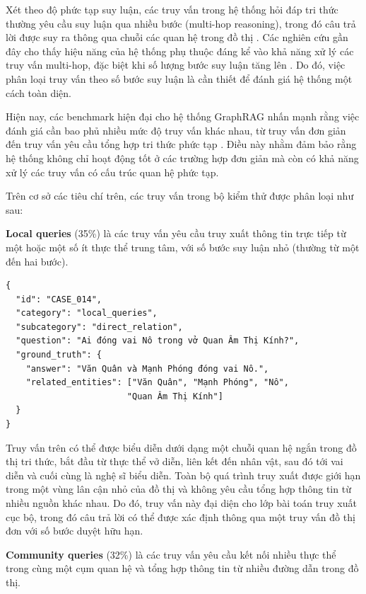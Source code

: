 Xét theo độ phức tạp suy luận, các truy vấn trong hệ thống hỏi đáp tri thức thường yêu cầu suy luận qua nhiều bước (multi-hop reasoning), trong đó câu trả lời được suy ra thông qua chuỗi các quan hệ trong đồ thị \cite{wang2023multihop}. Các nghiên cứu gần đây cho thấy hiệu năng của hệ thống phụ thuộc đáng kể vào khả năng xử lý các truy vấn multi-hop, đặc biệt khi số lượng bước suy luận tăng lên \cite{shah2024multihop}. Do đó, việc phân loại truy vấn theo số bước suy luận là cần thiết để đánh giá hệ thống một cách toàn diện.

Hiện nay, các benchmark hiện đại cho hệ thống GraphRAG nhấn mạnh rằng việc đánh giá cần bao phủ nhiều mức độ truy vấn khác nhau, từ truy vấn đơn giản đến truy vấn yêu cầu tổng hợp tri thức phức tạp \cite{peng2025m3gqa}. Điều này nhằm đảm bảo rằng hệ thống không chỉ hoạt động tốt ở các trường hợp đơn giản mà còn có khả năng xử lý các truy vấn có cấu trúc quan hệ phức tạp.

Trên cơ sở các tiêu chí trên, các truy vấn trong bộ kiểm thử được phân loại như sau:

\textbf{Local queries} (35\%) là các truy vấn yêu cầu truy xuất thông tin trực tiếp từ một hoặc một số ít thực thể trung tâm, với số bước suy luận nhỏ (thường từ một đến hai bước).

\begin{tcolorbox}[colback=gray!5, colframe=black!50, arc=4pt, boxrule=0.5pt]
{\small
\begin{verbatim}
{
  "id": "CASE_014",
  "category": "local_queries",
  "subcategory": "direct_relation",
  "question": "Ai đóng vai Nô trong vở Quan Âm Thị Kính?",
  "ground_truth": {
    "answer": "Văn Quân và Mạnh Phóng đóng vai Nô.",
    "related_entities": ["Văn Quân", "Mạnh Phóng", "Nô", 
                        "Quan Âm Thị Kính"]
  }
}
\end{verbatim}
}
\end{tcolorbox}
Truy vấn trên có thể được biểu diễn dưới dạng một chuỗi quan hệ ngắn trong đồ thị tri thức, bắt đầu từ thực thể vở diễn, liên kết đến nhân vật, sau đó tới vai diễn và cuối cùng là nghệ sĩ biểu diễn. Toàn bộ quá trình truy xuất được giới hạn trong một vùng lân cận nhỏ của đồ thị và không yêu cầu tổng hợp thông tin từ nhiều nguồn khác nhau. Do đó, truy vấn này đại diện cho lớp bài toán truy xuất cục bộ, trong đó câu trả lời có thể được xác định thông qua một truy vấn đồ thị đơn với số bước duyệt hữu hạn.

\textbf{Community queries} (32\%) là các truy vấn yêu cầu kết nối nhiều thực thể trong cùng một cụm quan hệ và tổng hợp thông tin từ nhiều đường dẫn trong đồ thị.

